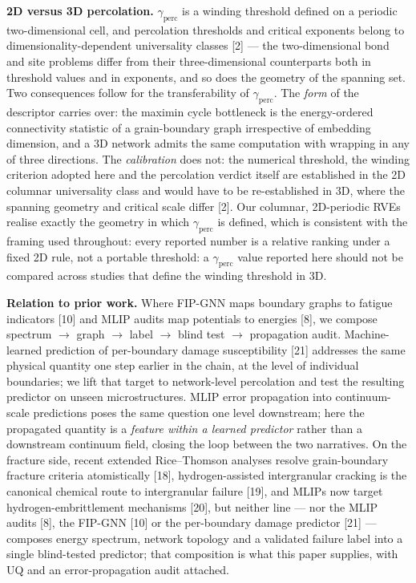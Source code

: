 \documentclass[12pt]{article}
\begin{document}
\textbf{2D versus 3D percolation.} $\gamma_{\mathrm{perc}}$ is a winding threshold defined on a periodic two-dimensional cell, and percolation thresholds and critical exponents belong to dimensionality-dependent universality classes [2] --- the two-dimensional bond and site problems differ from their three-dimensional counterparts both in threshold values and in exponents, and so does the geometry of the spanning set. Two consequences follow for the transferability of $\gamma_{\mathrm{perc}}$. The \textit{form} of the descriptor carries over: the maximin cycle bottleneck is the energy-ordered connectivity statistic of a grain-boundary graph irrespective of embedding dimension, and a 3D network admits the same computation with wrapping in any of three directions. The \textit{calibration} does not: the numerical threshold, the winding criterion adopted here and the percolation verdict itself are established in the 2D columnar universality class and would have to be re-established in 3D, where the spanning geometry and critical scale differ [2]. Our columnar, 2D-periodic RVEs realise exactly the geometry in which $\gamma_{\mathrm{perc}}$ is defined, which is consistent with the framing used throughout: every reported number is a relative ranking under a fixed 2D rule, not a portable threshold: a $\gamma_{\mathrm{perc}}$ value reported here should not be compared across studies that define the winding threshold in 3D.

\textbf{Relation to prior work.} Where FIP-GNN maps boundary graphs to fatigue indicators [10] and MLIP audits map potentials to energies [8], we compose spectrum $\rightarrow$ graph $\rightarrow$ label $\rightarrow$ blind test $\rightarrow$ propagation audit. Machine-learned prediction of per-boundary damage susceptibility [21] addresses the same physical quantity one step earlier in the chain, at the level of individual boundaries; we lift that target to network-level percolation and test the resulting predictor on unseen microstructures. MLIP error propagation into continuum-scale predictions poses the same question one level downstream; here the propagated quantity is a \textit{feature within a learned predictor} rather than a downstream continuum field, closing the loop between the two narratives. On the fracture side, recent extended Rice--Thomson analyses resolve grain-boundary fracture criteria atomistically [18], hydrogen-assisted intergranular cracking is the canonical chemical route to intergranular failure [19], and MLIPs now target hydrogen-embrittlement mechanisms [20], but neither line --- nor the MLIP audits [8], the FIP-GNN [10] or the per-boundary damage predictor [21] --- composes energy spectrum, network topology and a validated failure label into a single blind-tested predictor; that composition is what this paper supplies, with UQ and an error-propagation audit attached.
\end{document}
